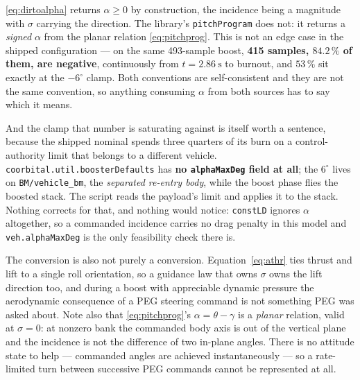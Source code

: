 \documentclass[11pt]{article}
\newcommand{\code}[1]{\texttt{#1}}
\begin{document}
\eqref{eq:dirtoalpha} returns $\alpha \geq 0$ by construction, the incidence
being a magnitude with $\sigma$ carrying the direction. The library's
\code{pitchProgram} does not: it returns a \emph{signed} $\alpha$ from the
planar relation \eqref{eq:pitchprog}. This is not an edge case in the shipped
configuration --- on the same 493-sample boost, \textbf{415 samples, $84.2\,\%$
of them, are negative}, continuously from $t = 2.86~\mathrm{s}$ to burnout, and
$53\,\%$ sit exactly at the $-6^{\circ}$ clamp. Both conventions are
self-consistent and they are not the same convention, so anything consuming
$\alpha$ from both sources has to say which it means.

And the clamp that number is saturating against is itself worth a sentence,
because the shipped nominal spends three quarters of its burn on a
control-authority limit that belongs to a different vehicle.
\code{coorbital.util.boosterDefaults} has \textbf{no \code{alphaMaxDeg} field at
all}; the $6^{\circ}$ lives on \code{BM/vehicle\_bm}, the \emph{separated
re-entry body}, while the boost phase flies the boosted stack. The script reads
the payload's limit and applies it to the stack. Nothing corrects for that,
and nothing would notice: \code{constLD} ignores $\alpha$ altogether, so a
commanded incidence carries no drag penalty in this model and
\code{veh.alphaMaxDeg} is the only feasibility check there is.

The conversion is also not purely a conversion. Equation~\eqref{eq:athr} ties thrust and lift to a single
roll orientation, so a guidance law that owns $\sigma$ owns the lift direction
too, and during a boost with appreciable dynamic pressure the aerodynamic
consequence of a PEG steering command is not something PEG was asked about.
Note also that \eqref{eq:pitchprog}'s $\alpha = \theta - \gamma$ is a
\emph{planar} relation, valid at $\sigma = 0$: at nonzero bank the commanded
body axis is out of the vertical plane and the incidence is not the difference
of two in-plane angles. There is no attitude state to help --- commanded angles
are achieved instantaneously --- so a rate-limited turn between successive PEG
commands cannot be represented at all.
\end{document}
